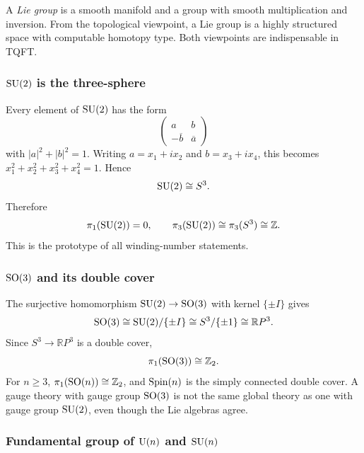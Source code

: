 A \emph{Lie group} is a smooth manifold and a group with smooth multiplication and inversion. From the topological viewpoint, a Lie group is a highly structured space with computable homotopy type. Both viewpoints are indispensable in TQFT.

\subsubsection{\texorpdfstring{$\operatorname{SU}(2)$ is the three-sphere}{SU(2) is the three-sphere}}

Every element of $\operatorname{SU}(2)$ has the form
\begin{equation}
  \begin{pmatrix}
  a & b \\
  -\overline b & \overline a
  \end{pmatrix}
\end{equation}
with $|a|^2+|b|^2=1$. Writing $a=x_1+ix_2$ and $b=x_3+ix_4$, this becomes $x_1^2+x_2^2+x_3^2+x_4^2=1$. Hence
\begin{equation}
  \operatorname{SU}(2) \cong S^3.
\end{equation}
Therefore
\begin{equation}
  \pi_1(\operatorname{SU}(2))=0,
  \qquad
  \pi_3(\operatorname{SU}(2))\cong \pi_3(S^3)\cong \mathbb{Z}.
\end{equation}
This is the prototype of all winding-number statements.

\subsubsection{\texorpdfstring{$\operatorname{SO}(3)$ and its double cover}{SO(3) and its double cover}}

The surjective homomorphism $\operatorname{SU}(2) \to \operatorname{SO}(3)$ with kernel $\{\pm I\}$ gives
\begin{equation}
  \operatorname{SO}(3) \cong \operatorname{SU}(2)/\{\pm I\} \cong S^3/\{\pm 1\} \cong \mathbb{R}P^3.
\end{equation}
Since $S^3 \to \mathbb{R}P^3$ is a double cover,
\begin{equation}
  \pi_1(\operatorname{SO}(3)) \cong \mathbb{Z}_2.
\end{equation}
For $n\ge 3$, $\pi_1(\operatorname{SO}(n))\cong \mathbb{Z}_2$, and $\operatorname{Spin}(n)$ is the simply connected double cover. A gauge theory with gauge group $\operatorname{SO}(3)$ is not the same global theory as one with gauge group $\operatorname{SU}(2)$, even though the Lie algebras agree.

\subsubsection{\texorpdfstring{Fundamental group of $\operatorname{U}(n)$ and $\operatorname{SU}(n)$}{Fundamental group of U(n) and SU(n)}}

